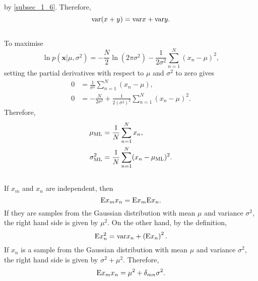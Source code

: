 %
by \ref{subsec_1_6}. Therefore,
%
\begin{equation}
{\rm var} (x + y) = {\rm var} x + {\rm var} y.
\end{equation}
%


\subsection{}
To maximise 
%
\begin{equation}
\ln p \left( \mathbf{x} | \mu, \sigma ^ 2 \right) = - \frac{N}{2} \ln \left( 2 \pi \sigma ^ 2 \right) - \frac{1}{2 \sigma ^ 2} \sum_{n = 1}^{N} (x_n - \mu) ^ 2,
\end{equation}
%
setting the partial derivatives with respect to $\mu$ and $\sigma ^ 2$ to zero gives
%
\begin{equation}
\begin{aligned}
0 &= \frac{1}{\sigma ^ 2} \sum_{n = 1}^{N} (x_n - \mu), \\
0 &= - \frac{N}{2 \sigma ^ 2} + \frac{1}{2 \left( \sigma ^ 2 \right) ^ 2} \sum_{n = 1}^{N} (x_n - \mu) ^ 2.
\end{aligned}
\end{equation}
%
Therefore,
%
\begin{equation}
\begin{aligned}
\mu_{\rm ML} &= \frac{1}{N} \sum_{n = 1}^{N} x_n, \\
\sigma_{\rm ML} ^ 2 &= \frac{1}{N} \sum_{n = 1}^{N} (x_n - \mu_{\rm ML}) ^ 2.
\end{aligned}
\end{equation}
%


\subsection{}
If $x_m$ and $x_n$ are independent, then
%
\begin{equation}
{\rm E} x_m x_n = {\rm E} x_m {\rm E} x_n.
\end{equation}
%
If they are samples from the Gaussian distribution with mean $\mu$ and variance $\sigma ^ 2$, the right hand side is given by $\mu ^ 2$.
On the other hand, by the definition, 
%
\begin{equation}
{\rm E} x_n ^ 2 =  {\rm var} x_n + \left( {\rm E} x_n \right) ^ 2.
\end{equation}
%
If $x_n$ is a sample from the Gaussian distribution with mean $\mu$ and variance $\sigma ^ 2$, the right hand side is given by $\sigma ^ 2 + \mu ^ 2$.
Therefore,
%
\begin{equation}
{\rm E} x_m x_n = \mu ^ 2 + \delta_{mn} \sigma ^ 2.
\end{equation}
%

